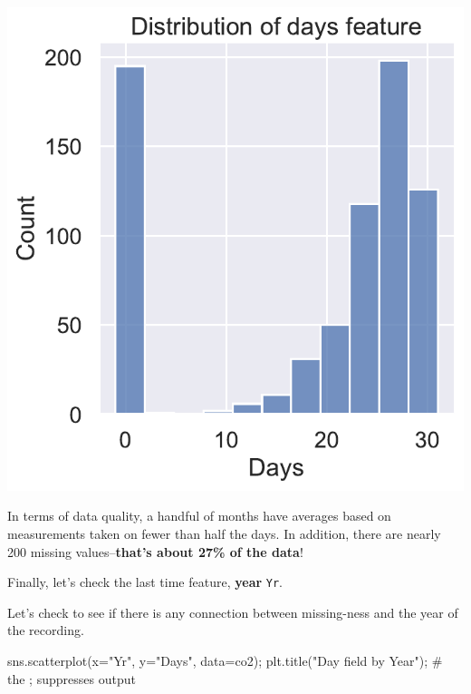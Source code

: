 \documentclass[
  letterpaper,
  DIV=11,
  numbers=noendperiod]{scrreprt}
\newenvironment{Shaded}{\begin{snugshade}}{\end{snugshade}}
\newcommand{\CommentTok}[1]{\textcolor[rgb]{0.37,0.37,0.37}{#1}}
\newcommand{\NormalTok}[1]{\textcolor[rgb]{0.00,0.23,0.31}{#1}}
\newcommand{\OperatorTok}[1]{\textcolor[rgb]{0.37,0.37,0.37}{#1}}
\newcommand{\StringTok}[1]{\textcolor[rgb]{0.13,0.47,0.30}{#1}}
\begin{document}
\includegraphics{eda/eda_files/figure-pdf/cell-67-output-1.pdf}

In terms of data quality, a handful of months have averages based on
measurements taken on fewer than half the days. In addition, there are
nearly 200 missing values--\textbf{that's about 27\% of the data}!

Finally, let's check the last time feature, \textbf{year} \texttt{Yr}.

Let's check to see if there is any connection between missing-ness and
the year of the recording.

\begin{Shaded}
\begin{Highlighting}[]
\NormalTok{sns.scatterplot(x}\OperatorTok{=}\StringTok{"Yr"}\NormalTok{, y}\OperatorTok{=}\StringTok{"Days"}\NormalTok{, data}\OperatorTok{=}\NormalTok{co2)}\OperatorTok{;}
\NormalTok{plt.title(}\StringTok{"Day field by Year"}\NormalTok{)}\OperatorTok{;} \CommentTok{\# the ; suppresses output}
\end{Highlighting}
\end{Shaded}
\end{document}
